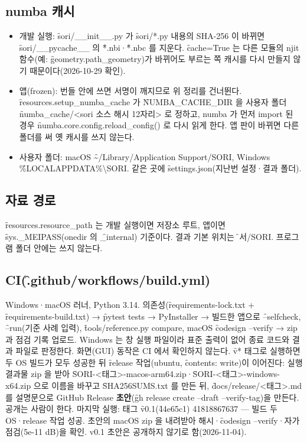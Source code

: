 \documentclass[10.5pt,a4paper]{article}
\begin{document}
\subsection{numba 캐시}
\begin{itemize}
\item 개발 실행: \f{sori/\_\_init\_\_.py} 가 \f{sori/*.py} 내용의 SHA-256 이 바뀌면 \f{sori/\_\_pycache\_\_} 의 \f{*.nbi}·\f{*.nbc} 를 지운다. \f{cache=True} 는 다른 모듈의 njit 함수(예: \f{geometry.path\_geometry})가 바뀌어도 부르는 쪽 캐시를 다시 만들지 않기 때문이다(2026-10-29 확인).
\item 앱(frozen): 번들 안에 쓰면 서명이 깨지므로 위 정리를 건너뛴다. \f{resources.setup\_numba\_cache} 가 \f{NUMBA\_CACHE\_DIR} 을 사용자 폴더 \f{numba\_cache/<sori 소스 해시 12자리>} 로 정하고, numba 가 먼저 import 된 경우 \f{numba.core.config.reload\_config()} 로 다시 읽게 한다. 앱 판이 바뀌면 다른 폴더를 써 옛 캐시를 쓰지 않는다.
\item 사용자 폴더: macOS \f{\textasciitilde/Library/Application Support/SORI}, Windows \f{\%LOCALAPPDATA\%\textbackslash SORI}. 같은 곳에 \f{settings.json}(지난번 설정·결과 폴더).
\end{itemize}

\subsection{자료 경로}
\f{resources.resource\_path} 는 개발 실행이면 저장소 루트, 앱이면 \f{sys.\_MEIPASS}(onedir 의 \f{\_internal}) 기준이다. 결과 기본 위치는 \f{문서/SORI}. 프로그램 폴더 안에는 쓰지 않는다.

\subsection{CI(\f{.github/workflows/build.yml})}
Windows·macOS 러너, Python 3.14. 의존성(\f{requirements-lock.txt} + \f{requirements-build.txt}) → \f{pytest tests} → PyInstaller → 빌드한 앱으로 \f{--selfcheck}, \f{--run}(기준 사례 입력), \f{tools/reference.py compare}, macOS \f{codesign --verify} → zip 과 점검 기록 업로드. Windows 는 창 실행 파일이라 표준 출력이 없어 종료 코드와 결과 파일로 판정한다. 화면(GUI) 동작은 CI 에서 확인하지 않는다. \f{v*} 태그로 실행하면 두 OS 빌드가 모두 성공한 뒤 \f{release} 작업(ubuntu, \f{contents: write})이 이어진다: 실행 결과물 zip 을 받아 \f{SORI-<태그>-macos-arm64.zip}·\f{SORI-<태그>-windows-x64.zip} 으로 이름을 바꾸고 \f{SHA256SUMS.txt} 를 만든 뒤, \f{docs/release/<태그>.md} 를 설명문으로 GitHub Release \textbf{초안}(\f{gh release create --draft --verify-tag})을 만든다. 공개는 사람이 한다. 마지막 실행: 태그 \f{v0.1}(\f{44e65c1}) 41818867637 — 빌드 두 OS·release 작업 성공. 초안의 macOS zip 을 내려받아 해시·\f{codesign --verify}·자가 점검(5e-11 dB)을 확인. v0.1 초안은 공개하지 않기로 함(2026-11-04).
\end{document}
